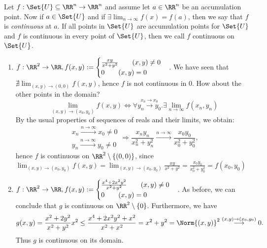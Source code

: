 \begin{defn}[continuity]
 Let $f:\Set{U}\subseteq\RR^n\to\RR^n$ and assume let $a\in\RR^n$ be an accumulation point. Now if $a\in\Set{U}$ and if $\exists\lim_{n\to\infty}f(x)=f(a)$, then we say that $f$ is \emph{continuous} at $a$. 
 If all points in $\Set{U}$ are accumulation points for $\Set{U}$ and $f$ is continuous in every point of $\Set{U}$, then we call $f$ continuous on $\Set{U}$. 
\end{defn}
\begin{exam}
 \begin{enumerate}
  \item $f:\RR^2\to\RR, f(x,y):=\begin{cases}\frac{xy}{x^2+y^2}\qquad(x,y)\neq 0\\0\qquad(x,y)=0\end{cases}$. We have seen that $\nexists\lim_{(x,y)\to(0,0)}f(x,y)$, hence $f$ is not continuous in $0$. 
  How about the other points in the domain?
  $$\lim_{(x,y)\to(x_0,y_0)}f(x,y)\Leftrightarrow\forall\overset{x_n\to x_0}{y_n\to y_0}.\exists\lim_{n\to\infty}f(x_n,y_n)$$
  By the usual properties of sequences of reals and their limits, we obtain:
  $$\begin{matrix}x_n\overset{n\to\infty}{\longrightarrow}x_0\neq 0\\y_n\overset{n\to\infty}{\longrightarrow}y_0\neq 0\end{matrix}\Rightarrow\frac{x_ny_n}{x_n^2+y_n^2}\overset{n\to\infty}{\longrightarrow}\frac{x_0y_0}{x_0^2+y_0^2},$$
	  hence $f$ is continuous on $\RR^2\setminus\{(0,0)\}$, since $\lim_{(x,y)\to(x_0,y_0)}f(x,y)=\lim_{(x,y)\to(x_0,y_0)}\frac{xy}{x^2+y^2}=\frac{x_0y_0}{x_0^2+y_0^2}=f(x_0,y_0)$
  \item $f:\RR^2\to\RR, f(x,y):=\begin{cases}\frac{x^4+2x^2y^2}{x^2+y^2}\qquad(x,y)\neq 0\\0\qquad(x,y)=0\end{cases}$. As before, we can conclude that $g$ is continuous on $\RR^2\setminus\{0\}$. Furthermore, we have $$g(x,y)=\frac{x^2+2y^2}{x^2+y^2}x^2\leq \frac{x^4+2x^2y^2+x^2}{x^2+x^2}=x^2+y^2=\Norm{(x,y)}^2\overset{(x,y)\to(x_0,y_0)}{\longrightarrow}0.$$
  Thus $g$ is continuous on its domain.
 \end{enumerate}
\end{exam}
